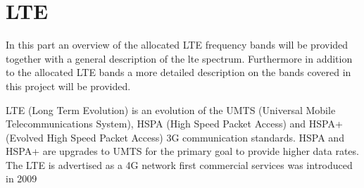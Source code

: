 \section{LTE}
In this part an overview of the allocated LTE frequency bands will be provided together with a general description of the lte spectrum.
Furthermore in addition to the allocated LTE bands a more detailed description on the bands covered in this project will be provided.

LTE (Long Term Evolution) is an evolution of the UMTS (Universal Mobile Telecommunications System), HSPA (High Speed Packet Access) and HSPA+ (Evolved High Speed Packet Access) 3G communication standards. HSPA and HSPA+ are upgrades to UMTS for the primary goal to provide higher data rates. The LTE is advertised as a 4G network first commercial services was introduced in 2009 
 
